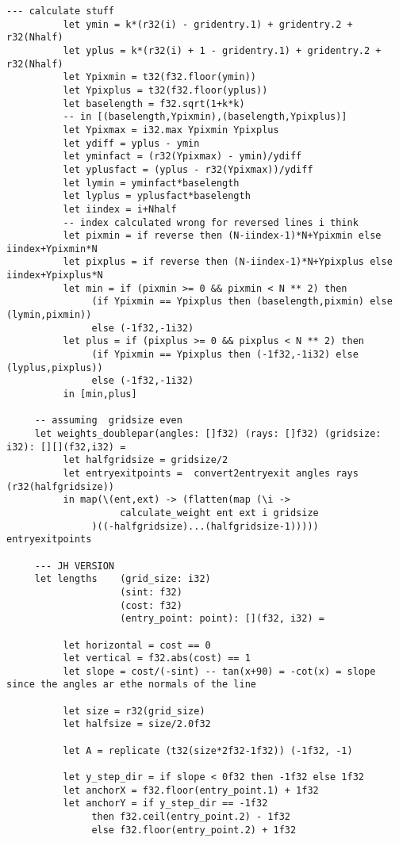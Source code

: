 \begin{lstlisting}[language=Futhark]
          --- calculate stuff
          let ymin = k*(r32(i) - gridentry.1) + gridentry.2 + r32(Nhalf)
          let yplus = k*(r32(i) + 1 - gridentry.1) + gridentry.2 + r32(Nhalf)
          let Ypixmin = t32(f32.floor(ymin))
          let Ypixplus = t32(f32.floor(yplus))
          let baselength = f32.sqrt(1+k*k)
          -- in [(baselength,Ypixmin),(baselength,Ypixplus)]
          let Ypixmax = i32.max Ypixmin Ypixplus
          let ydiff = yplus - ymin
          let yminfact = (r32(Ypixmax) - ymin)/ydiff
          let yplusfact = (yplus - r32(Ypixmax))/ydiff
          let lymin = yminfact*baselength
          let lyplus = yplusfact*baselength
          let iindex = i+Nhalf
          -- index calculated wrong for reversed lines i think
          let pixmin = if reverse then (N-iindex-1)*N+Ypixmin else iindex+Ypixmin*N
          let pixplus = if reverse then (N-iindex-1)*N+Ypixplus else iindex+Ypixplus*N
          let min = if (pixmin >= 0 && pixmin < N ** 2) then
               (if Ypixmin == Ypixplus then (baselength,pixmin) else (lymin,pixmin))
               else (-1f32,-1i32)
          let plus = if (pixplus >= 0 && pixplus < N ** 2) then
               (if Ypixmin == Ypixplus then (-1f32,-1i32) else (lyplus,pixplus))
               else (-1f32,-1i32)
          in [min,plus]

     -- assuming  gridsize even
     let weights_doublepar(angles: []f32) (rays: []f32) (gridsize: i32): [][](f32,i32) =
          let halfgridsize = gridsize/2
          let entryexitpoints =  convert2entryexit angles rays (r32(halfgridsize))
          in map(\(ent,ext) -> (flatten(map (\i ->
                    calculate_weight ent ext i gridsize
               )((-halfgridsize)...(halfgridsize-1))))) entryexitpoints

     --- JH VERSION
     let lengths    (grid_size: i32)
                    (sint: f32)
                    (cost: f32)
                    (entry_point: point): [](f32, i32) =

          let horizontal = cost == 0
          let vertical = f32.abs(cost) == 1
          let slope = cost/(-sint) -- tan(x+90) = -cot(x) = slope since the angles ar ethe normals of the line

          let size = r32(grid_size)
          let halfsize = size/2.0f32

          let A = replicate (t32(size*2f32-1f32)) (-1f32, -1)

          let y_step_dir = if slope < 0f32 then -1f32 else 1f32
          let anchorX = f32.floor(entry_point.1) + 1f32
          let anchorY = if y_step_dir == -1f32
               then f32.ceil(entry_point.2) - 1f32
               else f32.floor(entry_point.2) + 1f32


\end{lstlisting}
